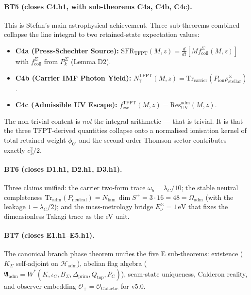 \documentclass[11pt,a4paper]{article}
\begin{document}
\paragraph{BT5 (closes C4.h1, with sub-theorems C4a, C4b, C4c).}
This is Stefan's main astrophysical achievement.  Three sub-theorems
combined collapse the line integral to two retained-state expectation
values:
\begin{itemize}[leftmargin=1.4em]
\item \textbf{C4a (Press-Schechter Source):}
\(\mathrm{SFR}_{\mathrm{TFPT}}(M,z)=
\frac{d}{dt}[M f_{\mathrm{coll}}^\Sigma(M,z)]\) with
\(f_{\mathrm{coll}}^\Sigma\) from \(P_k^\Sigma\) (Lemma D2).
\item \textbf{C4b (Carrier IMF Photon Yield):}
\(N_\gamma^{\mathrm{TFPT}}(M,z)=
\mathrm{Tr}_{\mathrm{carrier}}(P_{\mathrm{ion}}\rho_{\mathrm{stellar}}^\Sigma)\).
\item \textbf{C4c (Admissible UV Escape):}
\(f_{\mathrm{esc}}^{\mathrm{TFPT}}(M,z)=
\mathrm{Res}_{\mathrm{UV}}^{\mathrm{adm}}(M,z)\).
\end{itemize}
The non-trivial content is \emph{not} the integral arithmetic --- that
is trivial.  It is that the three TFPT-derived quantities collapse
onto a normalised ionisation kernel of total retained weight
\(\phi_0\), and the second-order Thomson sector contributes exactly
\(c_3^2/2\).

\paragraph{BT6 (closes D1.h1, D2.h1, D3.h1).}  Three claims unified:
the carrier two-form trace \(\omega_b=\lambda_C/10\); the stable
neutral completeness
\(\mathrm{Tr}_{\mathrm{adm}}(P_{\mathrm{neutral}})=N_{\mathrm{fam}}\,\dim S^+
=3\cdot 16=48=\Omega_{\mathrm{adm}}\) (with the leakage
\(1-\lambda_C/2\)); and the mass-metrology bridge
\(E_\nu^\Sigma=1\,\mathrm{eV}\) that fixes the dimensionless Takagi
trace as the eV unit.

\paragraph{BT7 (closes E1.h1--E5.h1).}  The canonical branch phase
theorem unifies the five E sub-theorems: existence
(\(K_\Sigma\) self-adjoint on \(\mathcal H_{\mathrm{adm}}\)),
abelian flag algebra
(\(\mathfrak A_{\mathrm{adm}}=W^\ast(K,\iota_C,B_\Sigma,\Delta_{\mathrm{prim}},Q_{\mathrm{top}},P_C)\)),
seam-state uniqueness, Calderon reality, and observer embedding
\(\mathcal O_+=\mathcal O_{\mathrm{Galactic}}\) for v5.0.
\end{document}
